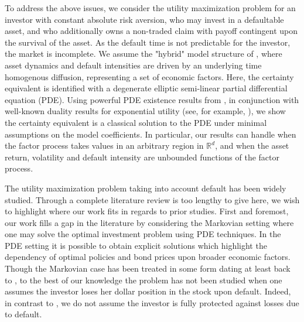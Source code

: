 \documentclass[11pt, letterpaper]{amsart}
\theoremstyle{definition}
\theoremstyle{remark}
\numberwithin{equation}{section}
\newcommand{\reals}{\mathbb R}
\begin{document}
To address the above issues, we consider the utility maximization problem for an investor with constant absolute risk aversion, who may invest in a defaultable asset, and who additionally owns a non-traded claim with payoff contingent upon the survival of the asset. As the default time is not predictable for the investor, the market is incomplete.  We assume the "hybrid" model structure of \cite{MR2212266,MR2359373}, where asset dynamics and default intensities are driven by an underlying time homogenous diffusion, representing a set of economic factors.  Here, the certainty equivalent is identified with a degenerate elliptic semi-linear partial differential equation (PDE). Using powerful PDE existence results from \cite{MR1465184, MR0181836}, in conjunction with well-known duality results for exponential utility  (see, for example, \cite{MR1891731, MR1891730, MR2489605}), we show the certainty equivalent is a classical solution to the PDE under minimal assumptions on the model coefficients.  In particular, our results can handle when the factor process takes values in an arbitrary region in $\reals^d$, and when the asset return, volatility and default intensity are unbounded functions of the factor process.

The utility maximization problem taking into account default has been widely studied. Through a complete literature review is too lengthy to give here, we wish to highlight where our work fits in regards to prior studies.  First and foremost, our work fills a gap in the literature by considering the Markovian setting where one may solve the optimal investment problem using PDE techniques. In the PDE setting it is possible to obtain explicit solutions which highlight the dependency of optimal policies and bond prices upon broader economic factors. Though the Markovian case has been treated in some form dating at least back to \cite{MR2359373,lukas2001pricing}, to the best of our knowledge the problem has not been studied when one assumes the investor loses her dollar position in the stock upon default.  Indeed, in contrast to \cite{MR2359373}, we do not assume the investor is fully protected against losses due to default.
\end{document}

